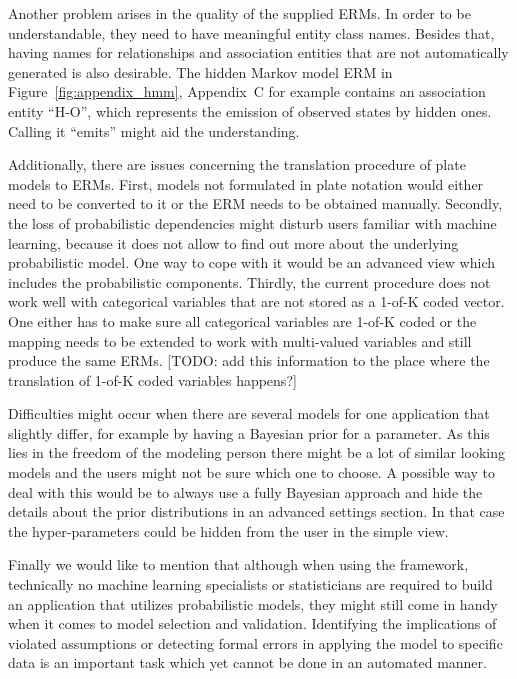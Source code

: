Another problem arises in the quality of the supplied ERMs. In order to be understandable, they need to have meaningful entity class names. Besides that, having names for relationships and association entities that are not automatically generated is also desirable. The hidden Markov model ERM in Figure~\ref{fig:appendix_hmm}, Appendix~C for example contains an association entity ``H-O'', which represents the emission of observed states by hidden ones. Calling it ``emits'' might aid the understanding.

Additionally, there are issues concerning the translation procedure of plate models to ERMs. First, models not formulated in plate notation would either need to be converted to it or the ERM needs to be obtained manually. Secondly, the loss of probabilistic dependencies might disturb users familiar with machine learning, because it does not allow to find out more about the underlying probabilistic model. One way to cope with it would be an advanced view which includes the probabilistic components. Thirdly, the current procedure does not work well with categorical variables that are not stored as a 1-of-K coded vector. One either has to make sure all categorical variables are 1-of-K coded or the mapping needs to be extended to work with multi-valued variables and still produce the same ERMs. [TODO: add this information to the place where the translation of 1-of-K coded variables happens?]

Difficulties might occur when there are several models for one application that slightly differ, for example by having a Bayesian prior for a parameter. As this lies in the freedom of the modeling person there might be a lot of similar looking models and the users might not be sure which one to choose. A possible way to deal with this would be to always use a fully Bayesian approach and hide the details about the prior distributions in an advanced settings section. In that case the hyper-parameters could be hidden from the user in the simple view.

Finally we would like to mention that although when using the framework, technically no machine learning specialists or statisticians are required to build an application that utilizes probabilistic models, they might still come in handy when it comes to model selection and validation. Identifying the implications of violated assumptions or detecting formal errors in applying the model to specific data is an important task which yet cannot be done in an automated manner.

